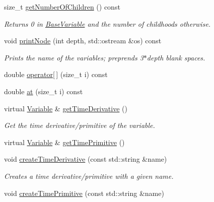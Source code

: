 \begin{DoxyCompactItemize}
size\+\_\+t \hyperlink{classocra_1_1Variable_ac3eca676a03a9483fdba4c5afc1680f6}{get\+Number\+Of\+Children} () const 
\begin{DoxyCompactList}\small\item\em Returns 0 in \hyperlink{classocra_1_1BaseVariable}{Base\+Variable} and the number of childhoods otherwise. \end{DoxyCompactList}\item 
void \hyperlink{classocra_1_1Variable_ad2850b089d6ae34339f55d2e38491fdb}{print\+Node} (int depth, std\+::ostream \&os) const 
\begin{DoxyCompactList}\small\item\em Prints the name of the variables; preprends 3$\ast$depth blank spaces. \end{DoxyCompactList}\end{DoxyCompactItemize}
{\bf }\par
\begin{DoxyCompactItemize}
\item 
double \hyperlink{classocra_1_1Variable_aaa2fac7f9a62e06c72a62aa077839c99}{operator\mbox{[}$\,$\mbox{]}} (size\+\_\+t i) const 
\item 
double \hyperlink{classocra_1_1Variable_a3d381fccfc834d65dae16335c42c3a3e}{at} (size\+\_\+t i) const 
\end{DoxyCompactItemize}

{\bf }\par
\begin{DoxyCompactItemize}
\item 
virtual \hyperlink{classocra_1_1Variable}{Variable} \& \hyperlink{classocra_1_1Variable_a06ee384364d5c6bd1ea4bc4b38d6268c}{get\+Time\+Derivative} ()
\begin{DoxyCompactList}\small\item\em Get the time derivative/primitive of the variable. \end{DoxyCompactList}\item 
virtual \hyperlink{classocra_1_1Variable}{Variable} \& \hyperlink{classocra_1_1Variable_aca32d63e60dc79de340b2f122dad0dc5}{get\+Time\+Primitive} ()
\end{DoxyCompactItemize}

{\bf }\par
\begin{DoxyCompactItemize}
\item 
void \hyperlink{classocra_1_1Variable_a7568587518043287ad671e53c0c04252}{create\+Time\+Derivative} (const std\+::string \&name)
\begin{DoxyCompactList}\small\item\em Creates a time derivative/primitive with a given name. \end{DoxyCompactList}\item 
void \hyperlink{classocra_1_1Variable_ac21275c0369ff7412d44bbb8ca5b9c7b}{create\+Time\+Primitive} (const std\+::string \&name)
\end{DoxyCompactItemize}


